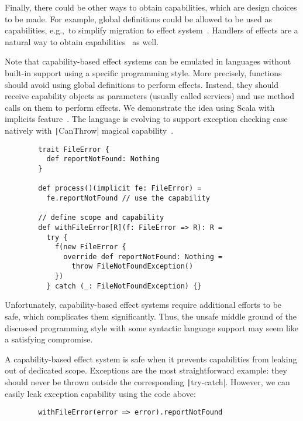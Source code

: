 \documentclass[conference]{IEEEtran}
\begin{document}
    Finally, there could be other ways to obtain capabilities, which are design choices to be made.
    For example, global definitions could be allowed to be used as capabilities, e.g.,\ to simplify migration to effect system~\cite{brachthauser2022effects, odersky2022scoped}.
    Handlers of effects are a natural way to obtain capabilities~\cite{brachthauser2020effects} as well.


    Note that capability-based effect systems can be emulated in languages without built-in support using a specific programming style.
    More precisely, functions should avoid using global definitions to perform effects.
    Instead, they should receive capability objects as parameters (usually called services) and use method calls on them to perform effects.
    We demonstrate the idea using Scala with implicits feature~\cite{odersky2004scala}.
    The language is evolving to support exception checking case natively with \texttt|CanThrow| magical capability~\cite{odersky2021safer}.
    \begin{verbatim}
        trait FileError {
          def reportNotFound: Nothing
        }

        def process()(implicit fe: FileError) =
          fe.reportNotFound // use the capability

        // define scope and capability
        def withFileError[R](f: FileError => R): R =
          try {
            f(new FileError {
              override def reportNotFound: Nothing =
                throw FileNotFoundException()
            })
          } catch (_: FileNotFoundException) {}
    \end{verbatim}


    Unfortunately, capability-based effect systems require additional efforts to be safe, which complicates them significantly.
    Thus, the unsafe middle ground of the discussed programming style with some syntactic language support may seem like a satisfying compromise.

    A capability-based effect system is safe when it prevents capabilities from leaking out of dedicated scope.
    Exceptions are the most straightforward example: they should never be thrown outside the corresponding \texttt|try-catch|.
    However, we can easily leak exception capability using the code above:
    \begin{verbatim}
        withFileError(error => error).reportNotFound
    \end{verbatim}
\end{document}
